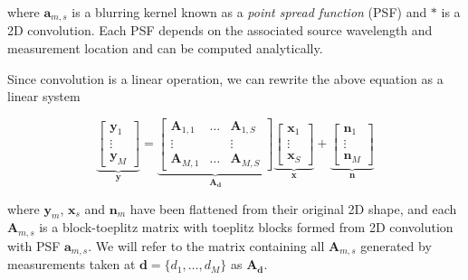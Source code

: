\documentclass{article}
\begin{document}
where $\bm{a}_{m,s}$ is a blurring kernel known as a \emph{point spread
function} (PSF) and $\ast$ is a 2D convolution. Each PSF depends on the
associated source wavelength and measurement location and can be computed
analytically.

Since convolution is a linear operation, we can rewrite the above equation as a
linear system

\begin{equation}
  \underbrace{
    \begin{bmatrix}\bm{y}_1 \\ \vdots \\ \bm{y}_M\end{bmatrix}
  }_{\bm{y}}
  =
  \underbrace{
    \begin{bmatrix}
      \bm{A}_{1, 1} & \hdots & \bm{A}_{1, S} \\
      \vdots & & \vdots \\
      \bm{A}_{M, 1} & \hdots & \bm{A}_{M, S}
    \end{bmatrix}
  }_{\bm{A}_{\bm{d}}}
  \underbrace{
    \begin{bmatrix}\bm{x}_1 \\ \vdots \\ \bm{x}_S\end{bmatrix}
  }_{\bm{x}}
  +
  \underbrace{
    \begin{bmatrix}\bm{n}_1 \\ \vdots \\ \bm{n}_M\end{bmatrix}
  }_{\bm{n}}
\label{eq:fourier_mtx}
\end{equation}


where $\bm{y}_m$, $\bm{x}_s$ and $\bm{n}_m$ have been flattened from their
original 2D shape, and each $\bm{A}_{m,s}$ is a block-toeplitz
matrix with toeplitz blocks formed from 2D convolution with PSF $\bm{a}_{m,s}$.
We will refer to the matrix containing all $\bm{A}_{m,s}$
generated by measurements taken at $\bm{d} = \{d_1, \dots, d_M\}$ as
$\bm{A}_{\bm{d}}$.
\end{document}
